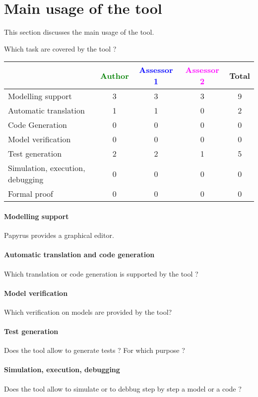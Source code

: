 \section{Main usage of the tool}
\label{main_usage}

This section discusses the main usage of the tool.

Which task are covered by the tool ?


\begin{tabular}{|l | c | c | c | c|}
\hline
& \textcolor{green}{Author} & \textcolor{blue}{Assessor 1} & \textcolor{magenta}{Assessor 2} & Total \\
\hline
Modelling support & 3 & 3 & 3 & 9 \\
\hline
Automatic translation & 1 & 1 & 0 & 2 \\
\hline
Code Generation & 0 & 0 & 0 & 0 \\
\hline
Model verification & 0 & 0 & 0 & 0 \\
\hline
Test generation & 2 & 2 & 1 & 5 \\
\hline
Simulation, execution, debugging & 0 & 0 & 0 & 0 \\
\hline
Formal proof & 0 & 0 & 0 & 0 \\
\hline
\end{tabular}

\paragraph{Modelling support}
Papyrus provides a graphical editor.

\paragraph{Automatic translation and code generation}
Which translation or code generation is supported by the tool ?

\paragraph{Model verification}
Which verification on models are provided by the tool?

\paragraph{Test generation}
Does the tool allow to generate tests ? For which purpose ?

\paragraph{Simulation, execution, debugging}
Does the tool allow to simulate or to debbug step by step a model or a code ?

